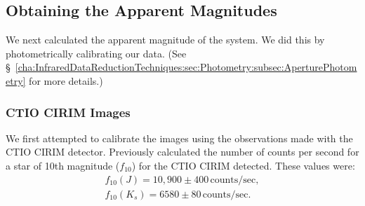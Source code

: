 
\subsection{Obtaining the Apparent Magnitudes}\label{cha:lightcurve:sec:Photometry:subsec:PhotometricCalibration}

We next calculated the apparent magnitude of the system. We did this by photometrically calibrating our data. (See \S~\vref{cha:InfraredDataReductionTechniques:sec:Photometry:subsec:AperturePhotometry} for more details.) %


\subsubsection{CTIO CIRIM Images}\label{cha:lightcurve:sec:Photometry:subsec:PhotometricCalibration:subsubsec:ctio}

We first attempted to calibrate the images using the observations made
with the CTIO CIRIM detector. Previously  calculated the number of counts per second for a star of 10th magnitude ($f_{10}$) for the CTIO CIRIM detected. These values were:%
\begin{eqnarray} \label{cha:lightcurve:sec:Photometry:subsec:PhotometricCalibration:subsubsec:ctio:eqn:f10}
f_{10}(J) = 10,900\pm400\,\mathrm{counts/sec},\\\nonumber
f_{10}(K_s) = 6580\pm80\,\mathrm{counts/sec}.
\end{eqnarray} %

